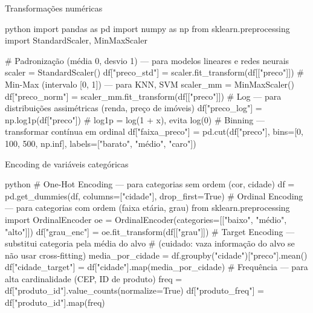 \documentclass[xcolor=dvipsnames,t,aspectratio=169]{beamer}
\begin{document}
\begin{frame}[c, fragile]{Transformações numéricas}

\begin{code}{python}
import pandas as pd
import numpy as np
from sklearn.preprocessing import StandardScaler, MinMaxScaler

# Padronização (média 0, desvio 1) — para modelos lineares e redes neurais
scaler = StandardScaler()
df["preco_std"] = scaler.fit_transform(df[["preco"]])
# Min-Max (intervalo [0, 1]) — para KNN, SVM
scaler_mm = MinMaxScaler()
df["preco_norm"] = scaler_mm.fit_transform(df[["preco"]])
# Log — para distribuições assimétricas (renda, preço de imóveis)
df["preco_log"] = np.log1p(df["preco"])  # log1p = log(1 + x), evita log(0)
# Binning — transformar contínua em ordinal
df["faixa_preco"] = pd.cut(df["preco"],
                           bins=[0, 100, 500, np.inf],
                           labels=["barato", "médio", "caro"])
\end{code}

\end{frame}


\begin{frame}[c, fragile]{Encoding de variáveis categóricas}

\begin{code}{python}
# One-Hot Encoding — para categorias sem ordem (cor, cidade)
df = pd.get_dummies(df, columns=["cidade"], drop_first=True)
# Ordinal Encoding — para categorias com ordem (faixa etária, grau)
from sklearn.preprocessing import OrdinalEncoder
oe = OrdinalEncoder(categories=[["baixo", "médio", "alto"]])
df["grau_enc"] = oe.fit_transform(df[["grau"]])
# Target Encoding — substitui categoria pela média do alvo
# (cuidado: vaza informação do alvo se não usar cross-fitting)
media_por_cidade = df.groupby("cidade")["preco"].mean()
df["cidade_target"] = df["cidade"].map(media_por_cidade)
# Frequência — para alta cardinalidade (CEP, ID de produto)
freq = df["produto_id"].value_counts(normalize=True)
df["produto_freq"] = df["produto_id"].map(freq)
\end{code}

\end{frame}
\end{document}
